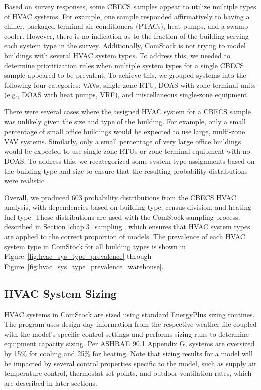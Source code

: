 Based on survey responses, some CBECS samples appear to utilize multiple types of HVAC systems. For example, one sample responded affirmatively to having a chiller, packaged terminal air conditioners (PTACs), heat pumps, and a swamp cooler. However, there is no indication as to the fraction of the building serving each system type in the survey. Additionally, ComStock is not trying to model buildings with several HVAC system types. To address this, we needed to determine prioritization rules when multiple system types for a single CBECS sample appeared to be prevalent. To achieve this, we grouped systems into the following four categories: VAVs, single-zone RTU, DOAS with zone terminal units (e.g., DOAS with heat pumps, VRF), and miscellaneous single-zone equipment.   

There were several cases where the assigned HVAC system for a CBECS sample was unlikely given the size and type of the building. For example, only a small percentage of small office buildings would be expected to use large, multi-zone VAV systems. Similarly, only a small percentage of very large office buildings would be expected to use single-zone RTUs or zone terminal equipment with no DOAS. To address this, we recategorized some system type assignments based on the building type and size to ensure that the resulting probability distributions were realistic.    

Overall, we produced 603 probability distributions from the CBECS HVAC analysis, with dependencies based on building type, census division, and heating fuel type. These distributions are used with the ComStock sampling process, described in Section \ref{chap:3_sampling}, which ensures that HVAC system types are applied to the correct proportion of models. The prevalence of each HVAC system type in ComStock for all building types is shown in Figure~\ref{fig:hvac_sys_type_prevalence} through Figure~\ref{fig:hvac_sys_type_prevalence_warehouse}.


\subsection{HVAC System Sizing}

HVAC systems in ComStock are sized using standard EnergyPlus sizing routines. The program uses design day information from the respective weather file coupled with the model's specific control settings and performs sizing runs to determine equipment capacity sizing. Per ASHRAE 90.1 Appendix G, systems are oversized by 15\% for cooling and 25\% for heating. Note that sizing results for a model will be impacted by several control properties specific to the model, such as supply air temperature control, thermostat set points, and outdoor ventilation rates, which are described in later sections.  

